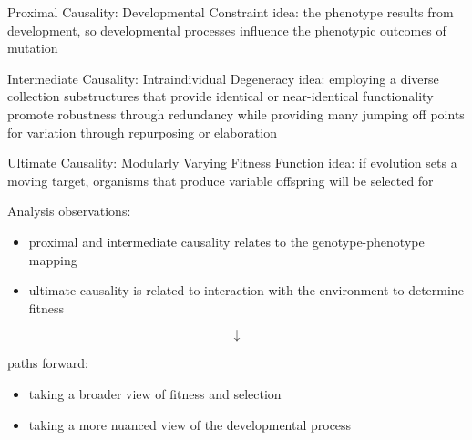 \begin{frame}{Proximal Causality: Developmental Constraint}
  idea: the phenotype results from development, so developmental processes influence the phenotypic outcomes of mutation
    
\end{frame}

\begin{frame}{Intermediate Causality: Intraindividual Degeneracy}
  idea: employing a diverse collection substructures that provide identical or near-identical functionality promote robustness through redundancy while providing many jumping off points for variation through repurposing or elaboration
  
\end{frame}

\begin{frame}{Ultimate Causality: Modularly Varying Fitness Function}
  idea: if evolution sets a moving target, organisms that produce variable offspring will be selected for 
  
\end{frame}

\begin{frame}{Analysis}
\alert{observations:}
\begin{itemize}
  \item proximal and intermediate causality relates to the genotype-phenotype mapping
  \item ultimate causality is related to interaction with the environment to determine fitness
\end{itemize}


\[\downarrow\]

\alert{paths forward:}
\begin{itemize}
\item taking a broader view of fitness and selection 
\item taking a more nuanced view of the developmental process
\end{itemize}
\end{frame}

